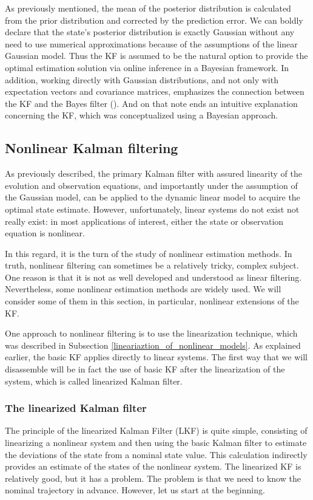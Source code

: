 As previously mentioned, the mean of the posterior distribution is calculated from the prior distribution and corrected by the prediction error. We can boldly declare that the state's posterior distribution is exactly Gaussian without any need to use numerical approximations because of the assumptions of the linear Gaussian model. Thus the KF is assumed to be the natural option to provide the optimal estimation solution via online inference in a Bayesian framework. In addition, working directly with Gaussian distributions, and not only with expectation vectors and covariance matrices, emphasizes the connection between the KF and the Bayes filter (\cite{brekke_fundamentals_2020}).
And on that note ends an intuitive explanation concerning the KF, which was conceptualized using a Bayesian approach.

\subsection{Nonlinear Kalman filtering}
As previously described, the primary Kalman filter with assured linearity of the evolution and observation equations, and importantly under the assumption of the Gaussian model, can be applied to the dynamic linear model to acquire the optimal state estimate. However, unfortunately, linear systems do not exist not really exist: in most applications of interest, either the state or observation equation is nonlinear.

In this regard, it is the turn of the study of nonlinear estimation methods. In truth, nonlinear filtering can sometimes be a relatively tricky, complex subject. One reason is that it is not as well developed and understood as linear filtering. Nevertheless, some nonlinear estimation methods are widely used. We will consider some of them in this section, in particular, nonlinear extensions of the KF.

One approach to nonlinear filtering is to use the linearization technique, which was described in Subsection \ref{lineariaztion_of_nonlinear_models}. As explained earlier, the basic KF applies directly to linear systems. The first way that we will disassemble will be in fact the use of basic KF after the linearization of the system, which is called linearized Kalman filter.

\subsubsection{The linearized Kalman filter}
The principle of the linearized Kalman Filter (LKF) is quite simple, consisting of linearizing a nonlinear system and then using the basic Kalman filter to estimate the deviations of the state from a nominal state value. This calculation indirectly provides an estimate of the states of the nonlinear system. The linearized KF is relatively good, but it has a problem. The problem is that we need to know the nominal trajectory in advance. However, let us start at the beginning.

